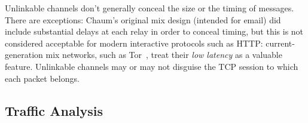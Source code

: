 \documentclass{zarticle}
\begin{document}
Unlinkable channels don't generally conceal the size or the timing of
messages.  There are exceptions: Chaum's original mix design (intended
for email) did include substantial delays at each relay in order to
conceal timing, but this is not considered acceptable for modern
interactive protocols such as HTTP: current-generation mix networks,
such as Tor~\cite{dingledine2004tor}, treat their \emph{low latency}
as a valuable feature.  Unlinkable channels may or may not disguise
the TCP session to which each packet belongs.

\subsection{Traffic Analysis}



\nocite{*}\printbibliography
\end{document}
